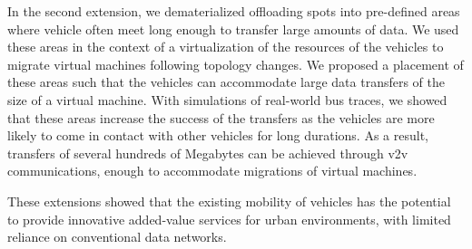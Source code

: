 In the second extension, we dematerialized offloading spots into pre-defined areas where vehicle often meet long enough to transfer large amounts of data. We used these areas in the context of a virtualization of the resources of the vehicles to migrate virtual machines following topology changes. We proposed a placement of these areas such that the vehicles can accommodate large data transfers of the size of a virtual machine. With simulations of real-world bus traces, we showed that these areas increase the success of the transfers as the vehicles are more likely to come in contact with other vehicles for long durations. As a result, transfers of several hundreds of Megabytes can be achieved through \acrshort{v2v} communications, enough to accommodate migrations of virtual machines.

These extensions showed that the existing mobility of vehicles has the potential to provide innovative added-value services for urban environments, with limited reliance on conventional data networks.